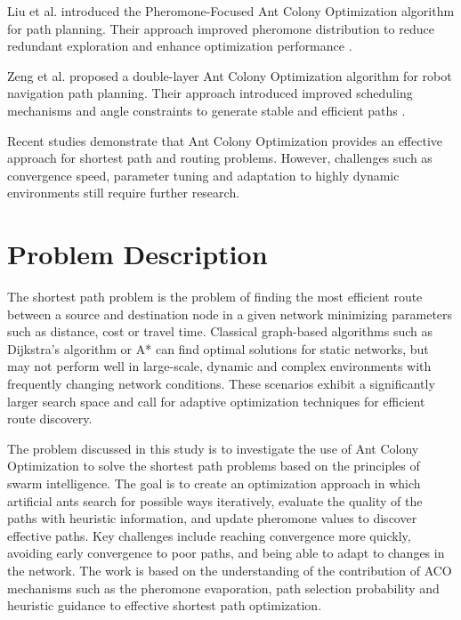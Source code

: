 \documentclass[conference]{IEEEtran}
\begin{document}
Liu et al. introduced the Pheromone-Focused Ant Colony Optimization algorithm for path planning. Their approach improved pheromone distribution to reduce redundant exploration and enhance optimization performance \cite{pfaco2026}.

Zeng et al. proposed a double-layer Ant Colony Optimization algorithm for robot navigation path planning. Their approach introduced improved scheduling mechanisms and angle constraints to generate stable and efficient paths \cite{idlaco2026}.

Recent studies demonstrate that Ant Colony Optimization provides an effective approach for shortest path and routing problems. However, challenges such as convergence speed, parameter tuning and adaptation to highly dynamic environments still require further research.


\section{Problem Description}

The shortest path problem is the problem of finding the most efficient route between a source and destination node in a given network minimizing parameters such as distance, cost or travel time. Classical graph-based algorithms such as Dijkstra’s algorithm or A* can find optimal solutions for static networks, but may not perform well in large-scale, dynamic and complex environments with frequently changing network conditions. These scenarios exhibit a significantly larger search space and call for adaptive optimization techniques for efficient route discovery.

The problem discussed in this study is to investigate the use of Ant Colony Optimization to solve the shortest path problems based on the principles of swarm intelligence. The goal is to create an optimization approach in which artificial ants search for possible ways iteratively, evaluate the quality of the paths with heuristic information, and update pheromone values to discover effective paths. Key challenges include reaching convergence more quickly, avoiding early convergence to poor paths, and being able to adapt to changes in the network. The work is based on the understanding of the contribution of ACO mechanisms such as the pheromone evaporation, path selection probability and heuristic guidance to effective shortest path optimization.
\end{document}
